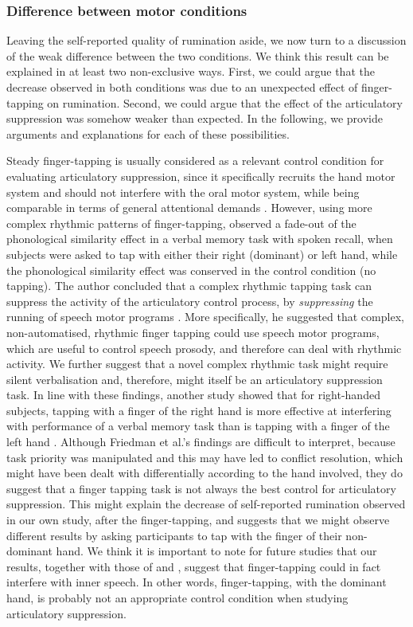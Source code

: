 \documentclass[12pt,]{book}
\begin{document}
\subsubsection{Difference between motor
conditions}\label{difference-between-motor-conditions}

Leaving the self-reported quality of rumination aside, we now turn to a
discussion of the weak difference between the two conditions. We think
this result can be explained in at least two non-exclusive ways. First,
we could argue that the decrease observed in both conditions was due to
an unexpected effect of finger-tapping on rumination. Second, we could
argue that the effect of the articulatory suppression was somehow weaker
than expected. In the following, we provide arguments and explanations
for each of these possibilities.

Steady finger-tapping is usually considered as a relevant control
condition for evaluating articulatory suppression, since it specifically
recruits the hand motor system and should not interfere with the oral
motor system, while being comparable in terms of general attentional
demands \citep[e.g.,][]{Gruber2001, Logie1987}. However, using more
complex rhythmic patterns of finger-tapping, \citet{Saito1994} observed
a fade-out of the phonological similarity effect in a verbal memory task
with spoken recall, when subjects were asked to tap with either their
right (dominant) or left hand, while the phonological similarity effect
was conserved in the control condition (no tapping). The author
concluded that a complex rhythmic tapping task can suppress the activity
of the articulatory control process, by \emph{suppressing} the running
of speech motor programs \citep[page 185]{Saito1994}. More specifically,
he suggested that complex, non-automatised, rhythmic finger tapping
could use speech motor programs, which are useful to control speech
prosody, and therefore can deal with rhythmic activity. We further
suggest that a novel complex rhythmic task might require silent
verbalisation and, therefore, might itself be an articulatory
suppression task. In line with these findings, another study showed that
for right-handed subjects, tapping with a finger of the right hand is
more effective at interfering with performance of a verbal memory task
than is tapping with a finger of the left hand \citep{Friedman1988}.
Although Friedman et al.'s findings are difficult to interpret, because
task priority was manipulated and this may have led to conflict
resolution, which might have been dealt with differentially according to
the hand involved, they do suggest that a finger tapping task is not
always the best control for articulatory suppression. This might explain
the decrease of self-reported rumination observed in our own study,
after the finger-tapping, and suggests that we might observe different
results by asking participants to tap with the finger of their
non-dominant hand. We think it is important to note for future studies
that our results, together with those of \citet{Saito1994} and
\citet{Friedman1988}, suggest that finger-tapping could in fact
interfere with inner speech. In other words, finger-tapping, with the
dominant hand, is probably not an appropriate control condition when
studying articulatory suppression.
\end{document}
